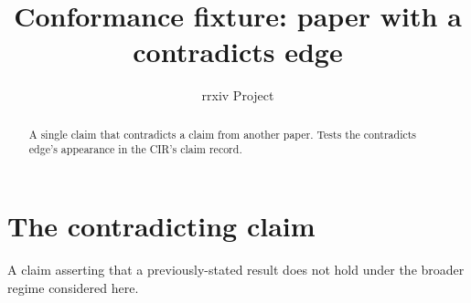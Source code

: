 \documentclass{rrxiv}
\title{Conformance fixture: paper with a contradicts edge}
\author{rrxiv Project}
\begin{document}
\maketitle

\begin{abstract}
A single claim that contradicts a claim from another paper. Tests the
contradicts edge's appearance in the CIR's claim record.
\end{abstract}

\section{The contradicting claim}

\begin{claim}
\label{claim:counter}
A claim asserting that a previously-stated result does not hold under
the broader regime considered here.
\end{claim}

\end{document}
